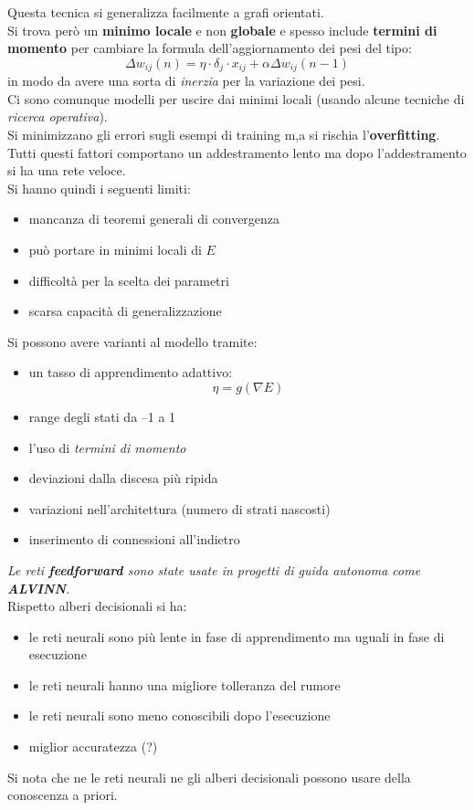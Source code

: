 \documentclass[a4paper,12pt, oneside]{book}
\begin{document}
Questa tecnica si generalizza facilmente a grafi orientati.\\  
Si trova però un \textbf{minimo locale} e non \textbf{globale} e spesso
include \textbf{termini di momento} per cambiare la formula dell'aggiornamento
dei pesi del tipo: 
\[\Delta w_{ij}(n)=\eta\cdot \delta_j\cdot x_{ij}+\alpha\Delta w_{ij}(n-1)\]
in modo da avere una sorta di \textit{inerzia} per la variazione dei pesi.\\
Ci sono comunque modelli per uscire dai minimi locali (usando alcune tecniche di
\textit{ricerca operativa}).\\
Si minimizzano gli errori sugli esempi di training m,a si rischia
l'\textbf{overfitting}.\\
Tutti questi fattori comportano un addestramento lento ma dopo l'addestramento
si ha una rete veloce.\\
Si hanno quindi i seguenti limiti:
\begin{itemize}
  \item mancanza di teoremi generali di convergenza
  \item può portare in minimi locali di $E$ 
  \item difficoltà per la scelta dei parametri 
  \item scarsa capacità di generalizzazione 
\end{itemize}
Si possono avere varianti al modello tramite:
\begin{itemize}
  \item un tasso di apprendimento adattivo:
  \[\eta=g(\nabla E)\]
  \item range degli stati da –1 a 1 
  \item l'uso di \textit{termini di momento}
  \item deviazioni dalla discesa più ripida 
  \item variazioni nell'architettura (numero di strati nascosti)
  \item inserimento di connessioni all'indietro
\end{itemize}
\textit{Le reti \textbf{feedforward} sono state usate in progetti di guida
  autonoma come \textbf{ALVINN}.}\\
Rispetto alberi decisionali si ha:
\begin{itemize}
  \item le reti neurali sono più lente in fase di apprendimento ma uguali in
  fase di esecuzione
  \item le reti neurali hanno una migliore tolleranza del rumore
  \item le reti neurali sono meno conoscibili dopo l'esecuzione
  \item miglior accuratezza (?)
\end{itemize}
Si nota che ne le reti neurali ne gli alberi decisionali possono usare della
conoscenza a priori.
\end{document}
